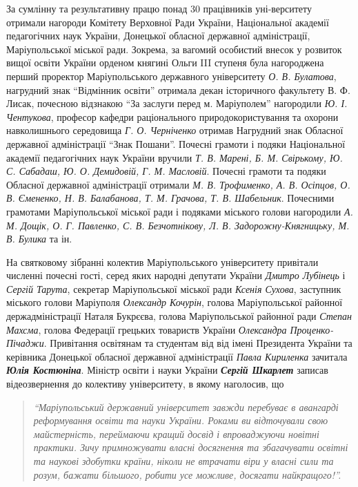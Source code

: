 За сумлінну та результативну працю понад 30 працівників уні\hyp{}верситету отримали
нагороди Комітету Верховної Ради України, Національної академії педагогічних
наук України, Донецької обласної державної адміністрації, Маріупольської
міської ради. Зокрема, за вагомий особистий внесок у розвиток вищої освіти
України орденом княгині Ольги III ступеня була нагороджена перший проректор
Маріупольського державного університету \emph{О. В. Булатова}, нагрудний знак
\enquote{Відмінник освіти} отримала декан історичного факультету В. Ф. Лисак, почесною
відзнакою \enquote{За заслуги перед м. Маріуполем} нагородили \emph{Ю. І. Чентукова}, професор
кафедри раціонального природокористування та охорони навколишнього середовища
\emph{Г. О. Черніченко} отримав Нагрудний знак Обласної державної адміністрації \enquote{Знак
Пошани}. Почесні грамоти і подяки Національної академії педагогічних наук
України вручили \emph{Т. В. Марені, Б. М. Свірькому, Ю. С. Сабадаш, Ю. О. Демидовій,
Г. М. Масловій}.  Почесні грамоти та подяки Обласної державної адміністрації
отримали \emph{М. В. Трофименко, А. В. Осіпцов, О. В. Ємененко, Н. В. Балабанова,
Т. М. Грачова, Т. В. Шабельник}. Почесними грамотами Маріупольської міської ради і
подяками міського голови нагородили \emph{А. М. Дощік, О. Г. Павленко, С. В. Безчотнікову,
Л. В. Задорожну-Княгницьку, М. В. Булика} та ін.


На святковому зібранні колектив Маріупольського університету привітали численні
почесні гості, серед яких народні депутати України \emph{Дмитро Лубінець} і \emph{Сергій
Тарута}, секретар Маріупольської міської ради \emph{Ксенія Сухова}, заступник міського
голови Маріуполя \emph{Олександр Кочурін}, голова Маріупольської районної
держадміністрації Наталя Букрєєва, голова Маріупольської районної ради \emph{Степан
Махсма}, голова Федерації грецьких товариств України \emph{Олександра
Проценко-Пічаджи}. Привітання освітянам та студентам від від імені Президента
України та керівника Донецької обласної державної адміністрації \emph{Павла Кириленка}
зачитала \emph{\textbf{Юлія Костюніна}}. Міністр освіти і науки України \emph{\textbf{Сергій Шкарлет}} записав
відеозвернення до колективу університету, в якому наголосив, що 
\begin{quote}
\em\enquote{Маріупольський
державний університет завжди перебуває в авангарді реформування освіти та науки
України. Роками ви відточували свою майстерність, переймаючи кращий досвід і
впроваджуючи новітні практики. Зичу примножувати власні досягнення та
збагачувати освітні та наукові здобутки країни, ніколи не втрачати віри у
власні сили та розум, бажати більшого, робити усе можливе, досягати
найкращого!}.
\end{quote}

